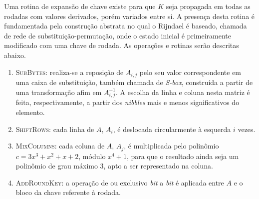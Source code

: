 \documentclass{ufsctex/ufsctex}
\begin{document}
Uma rotina de expansão de chave existe para que $K$ seja propagada em todas as
rodadas com valores derivados, porém variados entre si. A presença desta rotina
é fundamentada pela construção abstrata no qual o Rijndael é baseado, chamada
de rede de substituição-permutação, onde o estado inicial é primeiramente
modificado com uma chave de rodada. As operações e rotinas serão descritas
abaixo.

\begin{enumerate}[labelsep=0.5em, label=\roman*.]

  \item \textsc{SubBytes}: realiza-se a reposição de $A_{i, j}$ pelo seu valor
      correspondente em uma caixa de substituição, também chamada de
        \emph{S-box}, construída a partir de uma transformação afim em $A_{i,
        j}^{-1}$. A escolha da linha e coluna nesta matriz é feita,
        respectivamente, a partir dos \emph{nibbles} mais e menos
        significativos do elemento.

  \item \textsc{ShiftRows}: cada linha de $A$, $A_{i}$, é deslocada
      circularmente à esquerda $i$ vezes.

  \item \textsc{MixColumns}: cada coluna de $A$, $A_{j}$, é multiplicada pelo
      polinômio $c = 3x^{3} + x^{2} + x + 2$, módulo $x^{4} + 1$, para que o
        resultado ainda seja um polinômio de grau máximo 3, apto a ser
        representado na coluna.

  \item \textsc{AddRoundKey}: a operação de ou exclusivo \emph{bit} a
      \emph{bit} é aplicada entre $A$ e o bloco da chave referente à rodada.


\end{enumerate}
\end{document}
